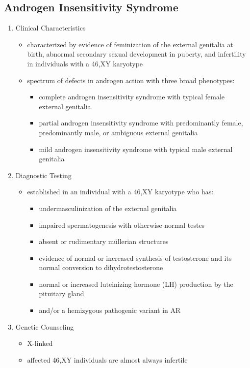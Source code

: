 \documentclass[12pt]{scrartcl}
\begin{document}
\subsection{Androgen Insensitivity Syndrome}
\label{sec:org8a0413e}
\begin{enumerate}
\item Clinical Characteristics
\label{sec:org3c51c9f}
\begin{itemize}
\item characterized by evidence of feminization of the external genitalia
at birth, abnormal secondary sexual development in puberty, and
infertility in individuals with a 46,XY karyotype
\item spectrum of defects in androgen action with three broad phenotypes:
\begin{itemize}
\item complete androgen insensitivity syndrome with typical
female external genitalia
\item partial androgen insensitivity syndrome with predominantly
female, predominantly male, or ambiguous external genitalia
\item mild androgen insensitivity syndrome with typical male external
genitalia
\end{itemize}
\end{itemize}
\item Diagnostic Testing
\label{sec:org88bc411}
\begin{itemize}
\item established in an individual with a 46,XY karyotype who has:
\begin{itemize}
\item undermasculinization of the external genitalia
\item impaired spermatogenesis with otherwise normal testes
\item absent or rudimentary müllerian structures
\item evidence of normal or increased synthesis of testosterone and its
normal conversion to dihydrotestosterone
\item normal or increased luteinizing hormone (LH) production by the
pituitary gland
\item and/or a hemizygous pathogenic variant in AR
\end{itemize}
\end{itemize}
\item Genetic Counseling
\label{sec:orgae52e57}
\begin{itemize}
\item X-linked
\item affected 46,XY individuals are almost always infertile
\end{itemize}
\end{enumerate}
\end{document}
